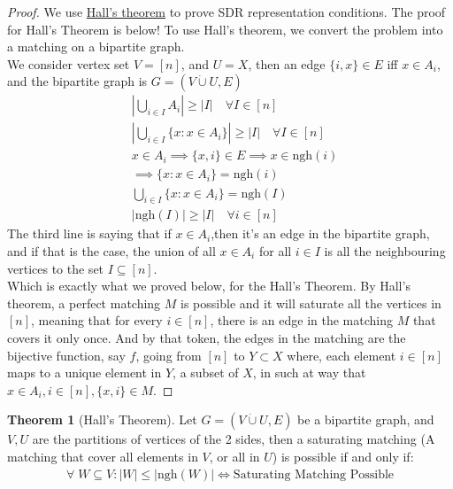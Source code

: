 \documentclass[]{article}
\theoremstyle{definition}
\newtheorem{theorem}{Theorem}       %
\begin{document}
    \begin{proof}
        We use \hyperref[theorem:Hall]{Hall's theorem} to prove SDR representation conditions. The proof for Hall's Theorem is below! To use Hall's theorem, we convert the problem into a matching on a bipartite graph. 
        \\[1.1em]
        We consider vertex set $V = [n]$, and $U = X$, then an edge $\{i, x\} \in E$ iff $x\in A_i$, and the bipartite graph is $G = (V\dot\cup U, E)$
        \begin{align}
            & \left|
                \bigcup_{i\in I} A_i
            \right| \ge |I| 
            \quad
            \forall I \in [n]
            \\
            & \left|
                \bigcup_{i\in I} \{x: x\in A_i\}
            \right| \ge |I| 
            \quad
            \forall I \in [n]
            \\
            & x\in A_i \implies \{x, i\}\in E \implies x \in \text{ngh}(i)
            \\
            & \implies \{x: x\in A_i\} = \text{ngh}(i)
            \\
            & \bigcup_{i \in I} \{x: x\in A_i\} = \text{ngh}(I)
            \\
            & |\text{ngh}(I)|\ge |I|\quad \forall i \in [n]
        \end{align}
        The third line is saying that if $x\in A_i$,then it's an edge in the bipartite graph, and if that is the case, the union of all $x\in A_i$ for all $i\in I$ is all the neighbouring vertices to the set $I\subseteq [n]$. 
        \\[1.1em]
        Which is exactly what we proved below, for the Hall's Theorem. By Hall's theorem, a perfect matching $M$ is possible and it will saturate all the vertices in $[n]$, meaning that for every $i\in [n]$, there is an edge in the matching $M$ that covers it only once. And by that token, the edges in the matching are the bijective function, say $f$, going from $[n]$ to $Y\subset X$ where, each element $i\in [n]$ maps to a unique element in $Y$, a subset of $X$, in such at way that $x\in A_i, i\in [n], \{x, i\}\in M$. 
    \end{proof}
    \begin{theorem}[Hall's Theorem]\label{theorem:Hall}
        Let $G = (V\dot{\cup} U, E)$ be a bipartite graph, and $V, U$ are the partitions of vertices of the 2 sides, then a saturating matching (A matching that cover all elements in $V$, or all in $U$) is possible if and only if: 
        \begin{align}
            \forall\; W \subseteq V: 
            |W| \le |\text{ngh}(W)| \iff 
            \text{Saturating Matching Possible}
        \end{align}
    \end{theorem}
\end{document}
